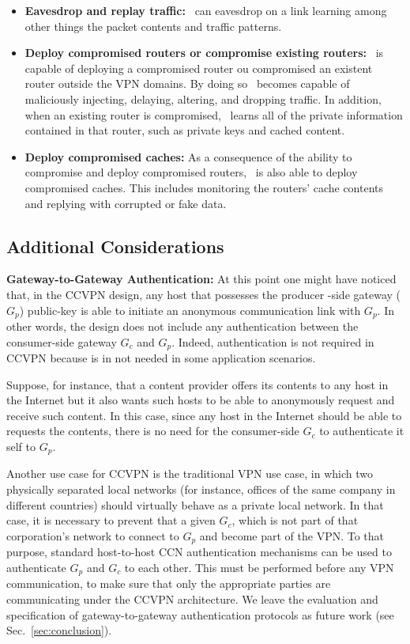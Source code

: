 \begin{itemize}
	\item \textbf{Eavesdrop and replay traffic:} \adv\ can eavesdrop on a link
    learning among other things the packet contents and traffic patterns.
	\item \textbf{Deploy compromised routers or compromise existing routers:} \adv\ is capable of
    deploying a compromised router ou compromised an existent router outside the VPN domains. By doing
    so \adv\ becomes capable of maliciously injecting, delaying, altering, and dropping traffic.
    In addition, when an existing router is compromised, \adv\ learns all of the private
    information contained in that router, such as private keys and cached content.
	\item \textbf{Deploy compromised caches:} As a consequence of the ability to compromise and
    deploy compromised routers, \adv\ is also able to deploy compromised caches. This
    includes monitoring the routers' cache contents and replying with corrupted or fake data.
\end{itemize}

\subsection{Additional Considerations}

\textbf{Gateway-to-Gateway Authentication:} At this point one might have noticed that,
in the CCVPN design, any host that possesses the producer -side gateway ($G_p$) public-key
is able to initiate an anonymous communication link with $G_p$. In other words, the design
does not include any authentication between the consumer-side gateway $G_c$ and $G_p$.
Indeed, authentication is not required in CCVPN because is in not needed in some application scenarios.

Suppose, for instance, that a content provider offers its contents to any host in the Internet
but it also  wants such hosts to be able to anonymously request and receive such content. In
this case, since any host in the Internet should be able to requests the contents, there is no
need for the consumer-side $G_c$ to authenticate it self to $G_p$.

Another use case for CCVPN is the traditional VPN use case, in which two physically separated
local networks (for instance, offices of the same company in different countries) should virtually
behave as a private local network. In that case, it is necessary to prevent that a given $G_c$,
which is not part of that corporation's network to connect to $G_p$ and become part of the VPN.
To that purpose, standard host-to-host CCN authentication mechanisms can be used to authenticate
$G_p$ and $G_c$ to each other. This must be performed before any VPN communication, to make sure
that only the appropriate parties are communicating under the CCVPN architecture. We leave the
evaluation and specification of gateway-to-gateway authentication protocols as future work (see Sec.~\ref{sec:conclusion}).

